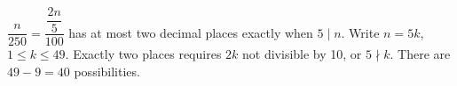 $\dfrac{n}{250} = \dfrac{\dfrac{2 n}{5}}{100}$ has at most two decimal places exactly when $5\mid n$. Write $n=5k$, $1\le k\le49$. Exactly two places requires $2k$ not divisible by 10, or $5\nmid k$. There are $49-9=\boxed{40}$ possibilities.
